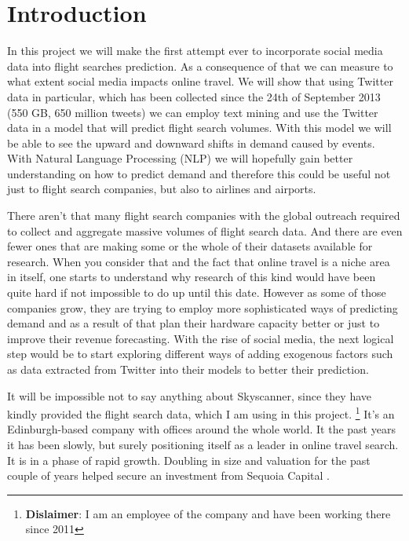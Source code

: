 \documentclass[minf,twoside,singlespacing,parskip,frontabs,notimes,11pt]{infthesis}
\begin{document}
\section{Introduction}

In this project we will make the first attempt ever to incorporate social media data into flight searches prediction. As a consequence of that we can measure to what extent social media impacts online travel. We will show that using Twitter data in particular, which has been collected since the 24th of September 2013 (550 GB, 650 million tweets) we can employ text mining and use the Twitter data in a model that will predict flight search volumes. With this model we will be able to see the upward and downward shifts in demand caused by events. With Natural Language Processing (NLP) we will hopefully gain better understanding on how to predict demand and therefore this could be useful not just to flight search companies, but also to airlines and airports. 


There aren't that many flight search companies with the global outreach required to collect and aggregate massive volumes of flight search data. And there are even fewer ones that are making some or the whole of their datasets available for research. When you consider that and the fact that online travel is a niche area in itself, one starts to understand why research of this kind would have been quite hard if not impossible to do up until this date. However as some of those companies grow, they are trying to employ more sophisticated ways of predicting demand and as a result of that plan their hardware capacity better or just to improve their revenue forecasting. With the rise of social media, the next logical step would be to start exploring different ways of adding exogenous factors such as data extracted from Twitter into their models to better their prediction. 


It will be impossible not to say anything about Skyscanner, since they have kindly provided the flight search data, which I am using in this project. \footnote{\textbf{Dislaimer}: I am an employee of the company and have been working there since 2011} It's an Edinburgh-based company with offices around the whole world. It the past years it has been slowly, but surely positioning itself as a leader in online travel search. It is in a phase of rapid growth. Doubling in size and valuation for the past couple of years helped secure an investment from Sequoia Capital \cite{seqcap}.  
\end{document}
